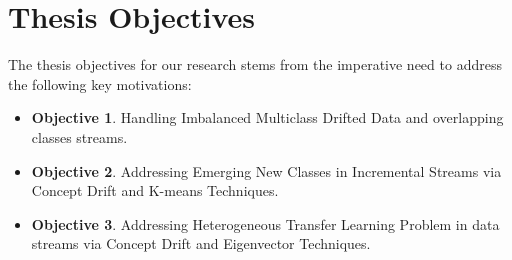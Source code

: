 \section{Thesis Objectives}
\label{sec:1_introduction_objectives}
The thesis objectives for our research stems from the imperative need to address the following key motivations:
\begin{itemize}
    \item \textbf{Objective 1}. Handling Imbalanced Multiclass Drifted Data and overlapping classes streams.
    \item \textbf{Objective 2}. Addressing Emerging New Classes in Incremental Streams via Concept Drift and K-means Techniques.
    \item \textbf{Objective 3}. Addressing Heterogeneous Transfer Learning Problem in data streams via Concept Drift and Eigenvector Techniques.
\end{itemize}
